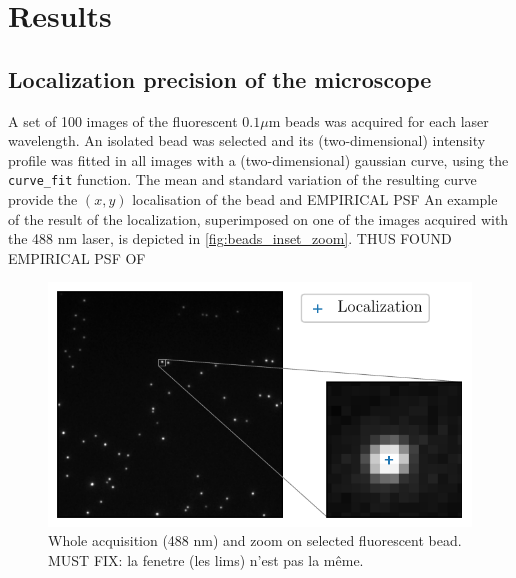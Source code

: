 \section{Results}
\subsection{Localization precision of the microscope}
A set of 100 images of the fluorescent $0.1 \mu$m beads was acquired for each laser wavelength.
An isolated bead was selected and its (two-dimensional) intensity profile was fitted in all images with a (two-dimensional) gaussian curve, using the \verb|curve_fit|  function. 
The mean and standard variation of the resulting curve provide the $(x,y)$ localisation of the bead and EMPIRICAL PSF
An example of the result of the localization, superimposed on one of the images acquired with the 488 nm laser, is depicted in \autoref{fig:beads_inset_zoom}. 
THUS FOUND EMPIRICAL PSF OF

\begin{figure}[htbp]
    \centering
    \includegraphics[scale=1]{figures/beads_inset_zoom.pdf}
    \caption{Whole acquisition (488 nm) and zoom on selected fluorescent bead. MUST FIX: la fenetre (les lims) n'est pas la même.}
    \label{fig:beads_inset_zoom}
\end{figure}


